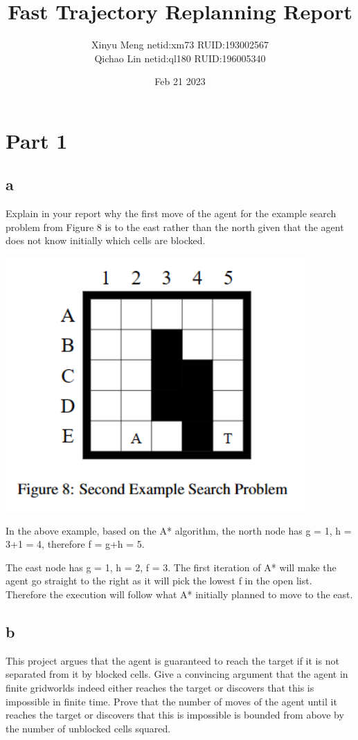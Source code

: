 \documentclass[12pt, letterpaper]{article}
\title{Fast Trajectory Replanning Report}
\author{Xinyu Meng netid:xm73 RUID:193002567 \\Qichao Lin netid:ql180 RUID:196005340}
\date{Feb 21 2023}
\begin{document}
\maketitle
\section{Part 1}
\subsection{a}

Explain in your report why the first move of the agent for the example search problem from Figure 8 is to the east rather than the north given that the agent does not know initially which cells are blocked.

\includegraphics{part1a.png} 

In the above example, based on the A* algorithm, the north node has g = 1, h = 3+1 = 4, therefore f = g+h = 5.

The east node has g = 1, h = 2, f = 3. The first iteration of A* will make the agent go straight to the right as it will pick the lowest f in the open list. Therefore the execution will follow what A* initially planned to move to the east. 

\subsection{b}

This project argues that the agent is guaranteed to reach the target if it is not separated from it by blocked cells. Give a convincing argument that the agent in finite gridworlds indeed either reaches the target or discovers that this is impossible in finite time. Prove that the number of moves of the agent until it reaches the target or discovers that this is impossible is bounded from above by the number of unblocked cells squared.
\end{document}
